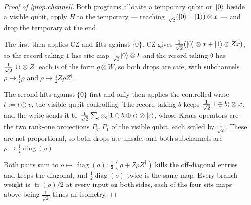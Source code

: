 \documentclass[acmsmall,screen,review,anonymous,nonacm]{acmart}
\begin{document}
\begin{proof}[Proof of \cref{prop:channel}]
Both programs allocate a temporary qubit on $\lvert 0 \rangle$ beside a visible qubit,
apply $H$ to the temporary --- reaching $\tfrac{1}{\sqrt2}(\lvert 0 \rangle+\lvert 1 \rangle)
\otimes x$ --- and drop the temporary at the end.

The first then applies $\mathrm{CZ}$ and lifts against $\{0\}$.
$\mathrm{CZ}$ gives $\tfrac{1}{\sqrt2}(\lvert 0 \rangle \otimes x + \lvert 1 \rangle \otimes
Zx)$, so the record taking $1$ has site map
$\tfrac{1}{\sqrt2}\lvert 0 \rangle \otimes I$ and the record taking $0$ has
$\tfrac{1}{\sqrt2}\lvert 1 \rangle \otimes Z$: each is of the form $g \otimes W$, so
both drops are safe, with subchannels $\rho \mapsto \tfrac12\rho$ and
$\rho \mapsto \tfrac12 Z\rho Z^{\dagger}$.

The second lifts against $\{0\}$ first and only then applies the controlled
write $t := t \oplus v$, the visible qubit controlling. The record taking $b$
keeps $\tfrac{1}{\sqrt2}\lvert 1 \oplus b \rangle \otimes x$, and the write sends it to
$\tfrac{1}{\sqrt2}\sum_c x_c \lvert 1 \oplus b \oplus c \rangle \otimes \lvert c \rangle$, whose Kraus
operators are the two rank-one projections $P_0, P_1$ of the visible
qubit, each scaled by $\tfrac{1}{\sqrt2}$. These are not proportional, so
both drops are unsafe, and both subchannels are
$\rho \mapsto \tfrac12\operatorname{diag}(\rho)$.

Both pairs sum to $\rho \mapsto \operatorname{diag}(\rho)$:
$\tfrac12(\rho + Z\rho Z^{\dagger})$ kills the off-diagonal entries and keeps
the diagonal, and $\tfrac12\operatorname{diag}(\rho)$ twice is the same map.
Every branch weight is $\operatorname{tr}(\rho)/2$ at every input on both
sides, each of the four site maps above being $\tfrac{1}{\sqrt2}$ times an
isometry.
\end{proof}
\end{document}
